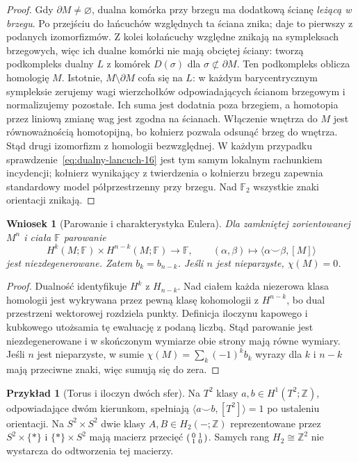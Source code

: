 \documentclass[11pt,a4paper,oneside]{report}
\newcommand{\Z}{\mathbb{Z}}
\theoremstyle{plain}
\newtheorem{wniosek}[twierdzenie]{Wniosek}
\theoremstyle{definition}
\newtheorem{przyklad}[twierdzenie]{Przykład}
\theoremstyle{remark}
\begin{document}
\begin{proof}
Gdy $\partial M\ne\varnothing$,
dualna komórka przy brzegu
ma dodatkową ścianę
\emph{leżącą w brzegu}.
Po przejściu do łańcuchów
względnych ta ściana znika;
daje to pierwszy z podanych
izomorfizmów. Z kolei
kołańcuchy względne znikają
na sympleksach brzegowych,
więc ich dualne komórki
nie mają obciętej ściany:
tworzą podkompleks dualny $L$ z komórek
$D(\sigma)$ dla $\sigma\not\subset\partial M$.
Ten podkompleks oblicza homologię $M$.
Istotnie, $M\setminus\partial M$ cofa się na $L$:
w każdym barycentrycznym sympleksie zerujemy wagi
wierzchołków odpowiadających ścianom brzegowym
i normalizujemy pozostałe. Ich suma jest dodatnia
poza brzegiem, a homotopia przez liniową zmianę wag
jest zgodna na ścianach. Włączenie wnętrza do $M$
jest równoważnością homotopijną, bo kołnierz pozwala
odsunąć brzeg do wnętrza. Stąd drugi izomorfizm
z homologii bezwzględnej.
W każdym przypadku
sprawdzenie~\eqref{eq:dualny-lancuch-16}
jest tym samym lokalnym
rachunkiem incydencji;
kołnierz wynikający z twierdzenia o kołnierzu brzegu
zapewnia standardowy model
półprzestrzenny przy brzegu.
Nad $\mathbb F_2$ wszystkie
znaki orientacji znikają.
\end{proof}

\begin{wniosek}[Parowanie i charakterystyka Eulera]
\label{cor:pd-parowanie-16}
Dla zamkniętej zorientowanej
$M^n$ i ciała $\mathbb F$
parowanie
\[
 H^k(M;\mathbb F)\times
 H^{n-k}(M;\mathbb F)
 \longrightarrow\mathbb F,\qquad
 (\alpha,\beta)\longmapsto
      \langle\alpha\smile\beta,[M]\rangle
\]
jest niezdegenerowane. Zatem
$b_k=b_{n-k}$. Jeśli $n$
jest nieparzyste, $\chi(M)=0$.
\end{wniosek}
\begin{proof}
Dualność identyfikuje
$H^k$ z $H_{n-k}$.
Nad ciałem każda niezerowa
klasa homologii jest wykrywana
przez pewną klasę kohomologii
z $H^{n-k}$, bo dual przestrzeni
wektorowej rozdziela punkty.
Definicja iloczynu kapowego
i kubkowego utożsamia tę
ewaluację z podaną liczbą.
Stąd parowanie jest
niezdegenerowane i w skończonym
wymiarze obie strony mają
równe wymiary. Jeśli $n$
jest nieparzyste, w sumie
$\chi(M)=\sum_k(-1)^kb_k$
wyrazy dla $k$ i $n-k$
mają przeciwne znaki,
więc sumują się do zera.
\end{proof}

\begin{przyklad}[Torus i iloczyn dwóch sfer]
Na $T^2$ klasy
$a,b\in H^1(T^2;\Z)$,
odpowiadające dwóm kierunkom,
spełniają
$\langle a\smile b,[T^2]\rangle=1$
po ustaleniu orientacji.
Na $S^2\times S^2$ dwie
klasy $A,B\in H_2(-;\Z)$
reprezentowane przez
$S^2\times\{*\}$ i
$\{*\}\times S^2$
mają macierz przecięć
$\begin{psmallmatrix}0&1\\1&0\end{psmallmatrix}$.
Samych rang $H_2\cong\Z^2$
nie wystarcza do odtworzenia
tej macierzy.
\end{przyklad}
\end{document}
